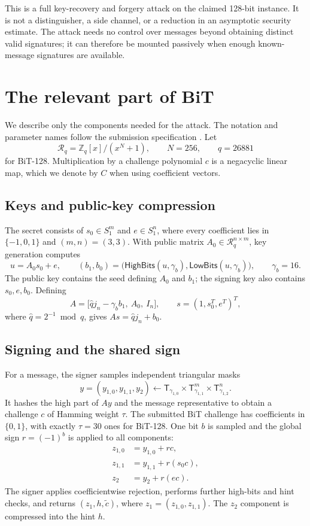 \documentclass[11pt,a4paper]{article}
\newcommand{\Z}{\mathbb{Z}}
\newcommand{\R}{\mathcal{R}}
\newcommand{\T}{\mathsf{T}}
\newcommand{\HighBits}{\mathsf{HighBits}}
\newcommand{\LowBits}{\mathsf{LowBits}}
\begin{document}
This is a full key-recovery and forgery attack on the claimed 128-bit instance.
It is not a distinguisher, a side channel, or a reduction in an asymptotic
security estimate.  The attack needs no control over messages beyond obtaining
distinct valid signatures; it can therefore be mounted passively when enough
known-message signatures are available.

\section{The relevant part of BiT}

We describe only the components needed for the attack.  The notation and
parameter names follow the submission specification \cite{BiT}.  Let
\[
  \R_q=\Z_q[x]/(x^N+1), \qquad N=256, \qquad q=26881
\]
for BiT-128.  Multiplication by a challenge polynomial $c$ is a negacyclic
linear map, which we denote by $C$ when using coefficient vectors.

\subsection{Keys and public-key compression}

The secret consists of $s_0\in S_1^m$ and $e\in S_1^n$, where every
coefficient lies in $\{-1,0,1\}$ and $(m,n)=(3,3)$.  With public matrix
$A_0\in\R_q^{n\times m}$, key generation computes
\[
  u=A_0s_0+e,
  \qquad
  (b_1,b_0)=\bigl(\HighBits(u,\gamma_b),
                         \LowBits(u,\gamma_b)\bigr),
  \qquad \gamma_b=16.
\]
The public key contains the seed defining $A_0$ and $b_1$; the signing key also
contains $s_0,e,b_0$.  Defining
\[
 A=\bigl[\widehat q j_n-\gamma_b b_1,\ A_0,\ I_n\bigr],
 \qquad s=(1,s_0^T,e^T)^T,
\]
where $\widehat q=2^{-1}\bmod q$, gives
$As=\widehat qj_n+b_0$.

\subsection{Signing and the shared sign}

For a message, the signer samples independent triangular masks
\[
 y=(y_{1,0},y_{1,1},y_2)
   \leftarrow
 \T_{\gamma_{1,0}}\times
 \T_{\gamma_{1,1}}^m\times
 \T_{\gamma_{1,2}}^n.
\]
It hashes the high part of $Ay$ and the message representative to obtain a
challenge $c$ of Hamming weight $\tau$.  The submitted BiT challenge has
coefficients in $\{0,1\}$, with exactly $\tau=30$ ones for BiT-128.  One bit
$b$ is sampled and the global sign $r=(-1)^b$ is applied to all components:
\begin{align*}
 z_{1,0}&=y_{1,0}+rc,\\
 z_{1,1}&=y_{1,1}+r(s_0c),\\
 z_2&=y_2+r(ec).
\end{align*}
The signer applies coefficientwise rejection, performs further high-bits and
hint checks, and returns $(z_1,h,\widetilde c)$, where
$z_1=(z_{1,0},z_{1,1})$.  The $z_2$ component is compressed into the hint $h$.
\end{document}
